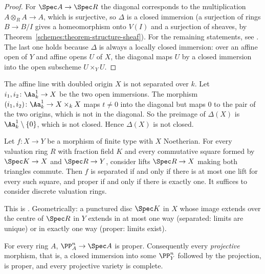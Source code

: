 \begin{proof}
For $\Spec A \to \Spec R$ the diagonal corresponds to the multiplication $A \otimes_RA \to A$, which is surjective, so $\Delta$ is a closed immersion (a
surjection of rings $B \to B/I$ gives a homeomorphism onto $V(I)$ and a surjection of sheaves, by Theorem~\ref{schemes:theorem-structure-sheaf}).
For the remaining statements, see \cite[Corollary II.4.2 and Corollary II.4.6]{hartshorne-ag}. The last one holds because $\Delta$ is always a
locally closed immersion: over an affine open of $Y$ and affine opens $U$ of $X$, the diagonal maps $U$ by a closed immersion into the open
subscheme $U \times_YU$.
\end{proof}

\begin{example}\label{schemes:example-not-separated}
The affine line with doubled origin $X$ is not separated over $k$. Let $i_1, i_2 \colon \Aa^1_k \to X$ be the two open immersions. The morphism
$(i_1, i_2) \colon \Aa^1_k \to X \times_kX$ maps $t \neq 0$ into the diagonal but maps $0$ to the pair of the two origins, which is not in the diagonal. So
the preimage of $\Delta(X)$ is $\Aa^1_k \setminus \{0\}$, which is not closed. Hence $\Delta(X)$ is not closed.
\end{example}

\begin{theorem}\label{schemes:theorem-valuative}
Let $f \colon X \to Y$ be a morphism of finite type with $X$ Noetherian. For every valuation ring $R$ with fraction field $K$ and every
commutative square formed by $\Spec K \to X$ and $\Spec R \to Y$, consider lifts $\Spec R \to X$ making both triangles commute. Then $f$ is separated
if and only if there is at most one lift for every such square, and proper if and only if there is exactly one. It suffices to consider discrete
valuation rings.
\end{theorem}

This is \cite[Theorems II.4.3 and II.4.7 and Exercise II.4.11]{hartshorne-ag}. Geometrically: a punctured disc $\Spec K$ in $X$ whose image extends
over the centre of $\Spec R$ in $Y$ extends in at most one way (separated: limits are unique) or in exactly one way (proper: limits exist).

\begin{theorem}\label{schemes:theorem-projective-proper}
For every ring $A$, $\PP^n_A \to \Spec A$ is proper. Consequently every \emph{projective} morphism, that is, a closed immersion into some $\PP^n_Y$
followed by the projection, is proper, and every projective variety is complete.
\end{theorem}

